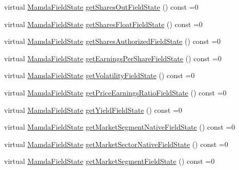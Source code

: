 \begin{CompactItemize}
\item 
virtual \hyperlink{namespaceWombat_93aac974f2ab713554fd12a1fa3b7d2a}{Mamda\-Field\-State} \hyperlink{classWombat_1_1MamdaFundamentals_3e81462fdbe5d194b64656ad44d98711}{get\-Shares\-Out\-Field\-State} () const =0
\item 
virtual \hyperlink{namespaceWombat_93aac974f2ab713554fd12a1fa3b7d2a}{Mamda\-Field\-State} \hyperlink{classWombat_1_1MamdaFundamentals_bda054b607ae27172a2aea4b25224853}{get\-Shares\-Float\-Field\-State} () const =0
\item 
virtual \hyperlink{namespaceWombat_93aac974f2ab713554fd12a1fa3b7d2a}{Mamda\-Field\-State} \hyperlink{classWombat_1_1MamdaFundamentals_3b2e1c2ff2ec88902f4e9c7b127852cc}{get\-Shares\-Authorized\-Field\-State} () const =0
\item 
virtual \hyperlink{namespaceWombat_93aac974f2ab713554fd12a1fa3b7d2a}{Mamda\-Field\-State} \hyperlink{classWombat_1_1MamdaFundamentals_e7eef94f859304d1fee6183dcef41680}{get\-Earnings\-Per\-Share\-Field\-State} () const =0
\item 
virtual \hyperlink{namespaceWombat_93aac974f2ab713554fd12a1fa3b7d2a}{Mamda\-Field\-State} \hyperlink{classWombat_1_1MamdaFundamentals_e84cec28dfd0ea05f96bca760df88f8f}{get\-Volatility\-Field\-State} () const =0
\item 
virtual \hyperlink{namespaceWombat_93aac974f2ab713554fd12a1fa3b7d2a}{Mamda\-Field\-State} \hyperlink{classWombat_1_1MamdaFundamentals_41e962b3c691f2a355f1b66ccdc3a6a5}{get\-Price\-Earnings\-Ratio\-Field\-State} () const =0
\item 
virtual \hyperlink{namespaceWombat_93aac974f2ab713554fd12a1fa3b7d2a}{Mamda\-Field\-State} \hyperlink{classWombat_1_1MamdaFundamentals_6409ffd956002efafa3c8881891d0378}{get\-Yield\-Field\-State} () const =0
\item 
virtual \hyperlink{namespaceWombat_93aac974f2ab713554fd12a1fa3b7d2a}{Mamda\-Field\-State} \hyperlink{classWombat_1_1MamdaFundamentals_051e9a92d80a41fadf421c094b996b4c}{get\-Market\-Segment\-Native\-Field\-State} () const =0
\item 
virtual \hyperlink{namespaceWombat_93aac974f2ab713554fd12a1fa3b7d2a}{Mamda\-Field\-State} \hyperlink{classWombat_1_1MamdaFundamentals_4baa69aa9248171d05776310b583db7e}{get\-Market\-Sector\-Native\-Field\-State} () const =0
\item 
virtual \hyperlink{namespaceWombat_93aac974f2ab713554fd12a1fa3b7d2a}{Mamda\-Field\-State} \hyperlink{classWombat_1_1MamdaFundamentals_d80a02902e1682818f3030af747e68ad}{get\-Market\-Segment\-Field\-State} () const =0

\end{CompactItemize}
